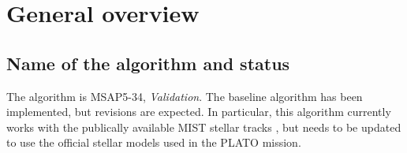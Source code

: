 \documentclass[a4paper, oneside, 11pt, article, english]{memoir}
\begin{document}
\begin{description}
  \firmlist
\end{description}


\clearpage
\chapter{General overview}
\label{chap:overview}

\section{Name of the algorithm and status}
\label{sec:name}
The algorithm is MSAP5-34, \emph{Validation}. 
The baseline algorithm has been implemented, but revisions are expected. 
In particular, this algorithm currently works with the publically available MIST stellar tracks \citep{MIST-I, MIST-II}, but needs to be updated to use the official stellar models used in the PLATO mission. 
\end{document}
